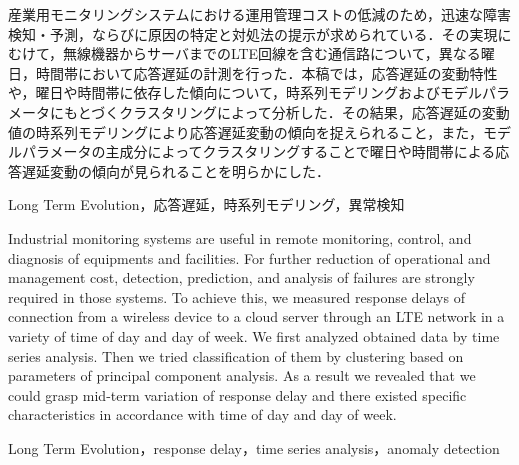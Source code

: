 \documentclass[technicalreport]{ieicej}
\begin{document}
\newcommand{\argmin}{\mathop{\rm arg~min}\limits}
\def \vector#1{\mbox{\boldmath $#1$}}

\begin{jabstract}
産業用モニタリングシステムにおける運用管理コストの低減のため，迅速な障害検知・予測，ならびに原因の特定と対処法の提示が求められている．その実現にむけて，無線機器からサーバまでのLTE回線を含む通信路について，異なる曜日，時間帯において応答遅延の計測を行った．本稿では，応答遅延の変動特性や，曜日や時間帯に依存した傾向について，時系列モデリングおよびモデルパラメータにもとづくクラスタリングによって分析した．その結果，応答遅延の変動値の時系列モデリングにより応答遅延変動の傾向を捉えられること，また，モデルパラメータの主成分によってクラスタリングすることで曜日や時間帯による応答遅延変動の傾向が見られることを明らかにした．
\end{jabstract}
\begin{jkeyword}
Long Term Evolution，応答遅延，時系列モデリング，異常検知
\end{jkeyword}
\begin{eabstract}
Industrial monitoring systems are useful in remote monitoring, control, and diagnosis of equipments and facilities.
 For further reduction of operational and management cost, detection, prediction, and analysis of failures are strongly required in those systems.
 To achieve this, we measured response delays of connection from a wireless device to a cloud server through an LTE network in a variety of time of day and day of week.
 We first analyzed obtained data by time series analysis.
 Then we tried classification of them by clustering based on parameters of principal component analysis.
 As a result we revealed that we could grasp mid-term variation of response delay and there existed specific characteristics in accordance with time of day and day of week.
\end{eabstract}
\begin{ekeyword}
Long Term Evolution，response delay，time series analysis，anomaly detection
\end{ekeyword}
\maketitle
\end{document}
